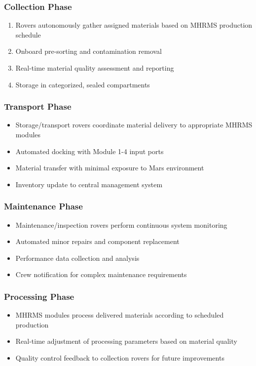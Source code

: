 \documentclass[12pt, a4paper]{article}
\begin{document}
\subsubsection{Collection Phase}
\begin{enumerate}
    \item Rovers autonomously gather assigned materials based on MHRMS production schedule
    \item Onboard pre-sorting and contamination removal
    \item Real-time material quality assessment and reporting
    \item Storage in categorized, sealed compartments
\end{enumerate}

\subsubsection{Transport Phase}
\begin{itemize}
    \item Storage/transport rovers coordinate material delivery to appropriate MHRMS modules
    \item Automated docking with Module 1-4 input ports
    \item Material transfer with minimal exposure to Mars environment
    \item Inventory update to central management system
\end{itemize}

\subsubsection{Maintenance Phase}
\begin{itemize}
    \item Maintenance/inspection rovers perform continuous system monitoring
    \item Automated minor repairs and component replacement
    \item Performance data collection and analysis
    \item Crew notification for complex maintenance requirements
\end{itemize}

\subsubsection{Processing Phase}
\begin{itemize}
    \item MHRMS modules process delivered materials according to scheduled production
    \item Real-time adjustment of processing parameters based on material quality
    \item Quality control feedback to collection rovers for future improvements
\end{itemize}
\end{document}
